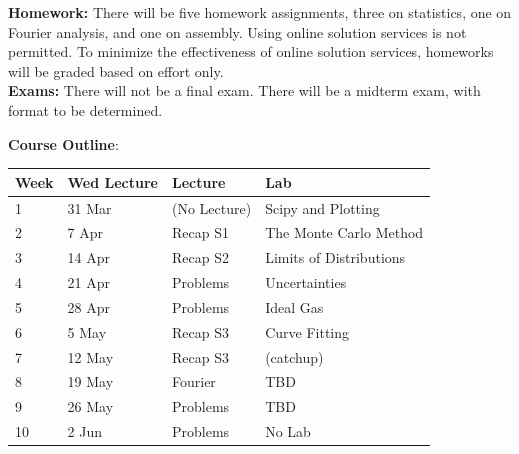 \documentclass[12pt]{article}
\begin{document}
\noindent
\textbf {Homework:}
There will be five homework assignments, three on statistics, one on
Fourier analysis, and one on assembly.  Using online solution services
is not permitted.  To minimize the effectiveness of online solution
services, homeworks will be graded based on effort only.\\

\noindent
\textbf {Exams:}
There will not be a final exam.  There will be a midterm exam, with format to be determined.\\

\begin{samepage}
\vskip 0.5cm
\noindent
\textbf {Course Outline}:

\begin{table}[h!]
\begin{tabular}{ llll }
\hline
\textbf{Week} & \textbf{Wed Lecture} & \textbf{Lecture} & \textbf{Lab}  \\
\hline
1 & 31 Mar & (No Lecture) & Scipy and Plotting \\
\hline
2 & 7 Apr & Recap S1 & The Monte Carlo Method \\
\hline
3 & 14 Apr & Recap S2 & Limits of Distributions \\
\hline
4 & 21 Apr & Problems &  Uncertainties\\
\hline
5 & 28 Apr & Problems &  Ideal Gas\\
\hline
6 & 5 May & Recap S3  & Curve Fitting \\
\hline 
7 & 12 May & Recap S3  & (catchup) \\
\hline
8 & 19 May & Fourier & TBD \\
\hline
9 & 26 May & Problems & TBD \\
\hline
10 & 2 Jun & Problems  & No Lab \\
\hline
\end{tabular} 
\end{table}
\end{samepage}
\end{document}
